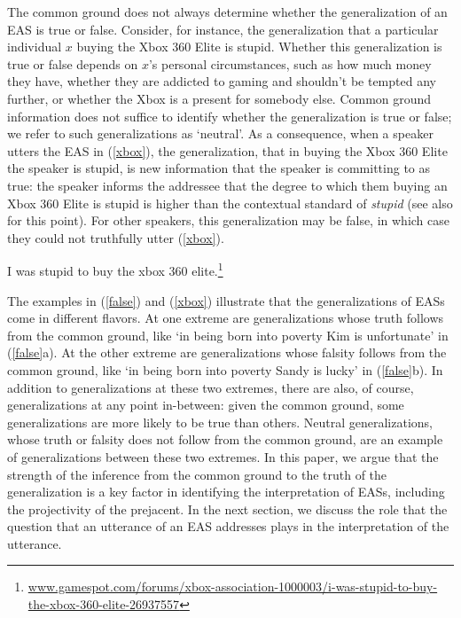 \documentclass[11pt,fleqn]{article}
\newcommand{\6}{\mbox{$[\hspace*{-.6mm}[$}}
\newcommand{\9}{\mbox{$]\hspace*{-.6mm}]$}}
\begin{document}
The common ground does not always determine whether the generalization of an EAS is true or false. Consider, for instance, the generalization that a particular individual $x$ buying the Xbox 360 Elite is stupid. Whether this generalization is true or false depends on $x$'s personal circumstances, such as how much money they have, whether they are addicted to gaming and shouldn't be tempted any further, or whether the Xbox is a present for somebody else. Common ground information does not suffice to identify whether the generalization is true or false; we refer to such generalizations as `neutral'. As a consequence, when a speaker utters the EAS in (\ref{xbox}), the generalization, that in buying the Xbox 360 Elite the speaker is stupid, is new information that the speaker is committing to as true: the speaker informs the addressee that the degree to which them buying an Xbox 360 Elite is stupid is higher than the contextual standard of {\em stupid} (see also \citealt{barker02} for this point). For other speakers, this generalization may be false, in which case they could not truthfully utter (\ref{xbox}).

\begin{exe}
\ex\label{xbox} I was stupid to buy the xbox 360 elite.\footnote{\url{www.gamespot.com/forums/xbox-association-1000003/i-was-stupid-to-buy-the-xbox-360-elite-26937557}}
\end{exe}

The examples in (\ref{false}) and (\ref{xbox}) illustrate that the generalizations of EASs come in different flavors. At one extreme are generalizations whose truth follows from the common ground, like `in being born into poverty Kim is unfortunate' in (\ref{false}a). At the other extreme are generalizations whose falsity follows from the common ground, like `in being born into poverty Sandy is lucky' in (\ref{false}b). In addition to generalizations at these two extremes, there are also, of course, generalizations at any point in-between: given the common ground, some generalizations are more likely to be true than others. Neutral generalizations, whose truth or falsity does not follow from the common ground, are an example of generalizations between these two extremes. In this paper, we argue that the strength of the inference from the common ground to the truth of the generalization is a key factor in identifying the interpretation of EASs, including the projectivity of the prejacent. In the next section, we discuss the role that the question that an utterance of an EAS addresses plays in the interpretation of the utterance.
\end{document}
